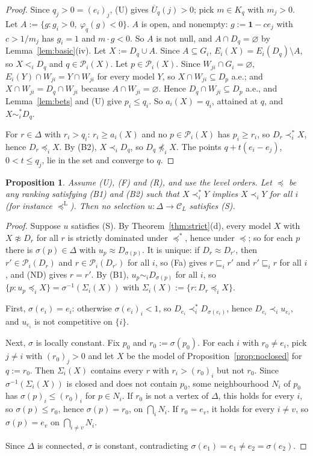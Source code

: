 \documentclass[11pt]{article}
\newtheorem{proposition}[theorem]{Proposition}
\theoremstyle{definition}
\newcommand{\one}{\mathbf 1}
\newcommand{\Pc}{\mathcal P}
\newcommand{\Ub}{\overline U}
\newcommand{\ws}{\preceq^{*}}
\newcommand{\wss}{\prec^{*}}
\newcommand{\wst}{\sim^{*}}
\newcommand{\wl}{\preceq^{\mathrm L}}
\begin{document}
\begin{proof}
Since $q_j>0=(e_i)_j$, (U) gives $\Ub_q(j)>0$; pick $m\in K_q$ with $m_j>0$. Let $A:=\{g:g_i>0,\ \varphi_q(g)<0\}$. $A$ is open, and nonempty: $g:=\one-ce_j$ with $c>1/m_j$ has $g_i=1$ and $m\cdot g<0$. So $A$ is not null, and $A\cap D_q=\varnothing$ by Lemma~\ref{lem:basic}(iv). Let $X:=D_q\cup A$. Since $A\subseteq G_i$, $E_i(X)=E_i(D_q)\setminus A$, so $X<_iD_q$ and $q\in\Pc_i(X)$. Let $p\in\Pc_i(X)$. Since $W_{ji}\cap G_i=\varnothing$, $E_i(Y)\cap W_{ji}=Y\cap W_{ji}$ for every model $Y$, so $X\cap W_{ji}\subseteq D_p$ a.e.; and $X\cap W_{ji}=D_q\cap W_{ji}$ because $A\cap W_{ji}=\varnothing$. Hence $D_q\cap W_{ji}\subseteq D_p$ a.e., and Lemma~\ref{lem:bets} and (U) give $p_i\le q_i$. So $a_i(X)=q_i$, attained at $q$, and $X\wst_iD_q$.

For $r\in\Delta$ with $r_i>q_i$: $r_i\ge a_i(X)$ and no $p\in\Pc_i(X)$ has $p_i\ge r_i$, so $D_r\wss_iX$, hence $D_r\preceq_iX$. By (B2), $X\prec_iD_q$, so $D_q\not\preceq_iX$. The points $q+t(e_i-e_j)$, $0<t\le q_j$, lie in the set and converge to $q$.
\end{proof}

\begin{proposition}\label{prop:noselection}
Assume (U), (F) and (R), and use the level orders. Let $\preceq$ be any ranking satisfying (B1) and (B2) such that $X\wss_iY$ implies $X\prec_iY$ for all $i$ (for instance $\wl$). Then no selection $u:\Delta\to\mathcal C_L$ satisfies (S).
\end{proposition}

\begin{proof}
Suppose $u$ satisfies (S). By Theorem~\ref{thm:strict}(d), every model $X$ with $X\not\approx D_r$ for all $r$ is strictly dominated under $\ws$, hence under $\preceq$; so for each $p$ there is $\sigma(p)\in\Delta$ with $u_p\approx D_{\sigma(p)}$. It is unique: if $D_r\approx D_{r'}$, then $r'\in\Pc_i(D_r)$ and $r\in\Pc_i(D_{r'})$ for all $i$, so (Fa) gives $r\sqsubseteq_ir'$ and $r'\sqsubseteq_ir$ for all $i$, and (ND) gives $r=r'$. By (B1), $u_p\sim_iD_{\sigma(p)}$ for all $i$, so $\{p:u_p\preceq_iX\}=\sigma^{-1}(\Sigma_i(X))$ with $\Sigma_i(X):=\{r:D_r\preceq_iX\}$.

First, $\sigma(e_i)=e_i$: otherwise $\sigma(e_i)_i<1$, so $D_{e_i}\wss_iD_{\sigma(e_i)}$, hence $D_{e_i}\prec_iu_{e_i}$, and $u_{e_i}$ is not competitive on $\{i\}$.

Next, $\sigma$ is locally constant. Fix $p_0$ and $r_0:=\sigma(p_0)$. For each $i$ with $r_0\ne e_i$, pick $j\ne i$ with $(r_0)_j>0$ and let $X$ be the model of Proposition~\ref{prop:noclosed} for $q:=r_0$. Then $\Sigma_i(X)$ contains every $r$ with $r_i>(r_0)_i$ but not $r_0$. Since $\sigma^{-1}(\Sigma_i(X))$ is closed and does not contain $p_0$, some neighbourhood $N_i$ of $p_0$ has $\sigma(p)_i\le(r_0)_i$ for $p\in N_i$. If $r_0$ is not a vertex of $\Delta$, this holds for every $i$, so $\sigma(p)\le r_0$, hence $\sigma(p)=r_0$, on $\bigcap_iN_i$. If $r_0=e_v$, it holds for every $i\ne v$, so $\sigma(p)=e_v$ on $\bigcap_{i\ne v}N_i$.

Since $\Delta$ is connected, $\sigma$ is constant, contradicting $\sigma(e_1)=e_1\ne e_2=\sigma(e_2)$.
\end{proof}
\end{document}
